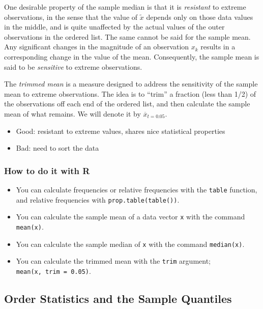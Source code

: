 \documentclass[]{book}
\providecommand{\tightlist}{%
  \setlength{\itemsep}{0pt}\setlength{\parskip}{0pt}}
\numberwithin{equation}{chapter}
\numberwithin{figure}{chapter}
\theoremstyle{plain}
\theoremstyle{definition}
\theoremstyle{remark}
\theoremstyle{definition}
\theoremstyle{definition}
\theoremstyle{remark}
\begin{document}
One desirable property of the sample median is that it is
\emph{resistant} to extreme observations, in the sense that the value of
\(\tilde{x}\) depends only on those data values in the middle, and is
quite unaffected by the actual values of the outer observations in the
ordered list. The same cannot be said for the sample mean. Any
significant changes in the magnitude of an observation \(x_{k}\) results
in a corresponding change in the value of the mean. Consequently, the
sample mean is said to be \emph{sensitive} to extreme observations.

The \emph{trimmed mean} is a measure designed to address the sensitivity
of the sample mean to extreme observations. The idea is to ``trim'' a
fraction (less than 1/2) of the observations off each end of the ordered
list, and then calculate the sample mean of what remains. We will denote
it by \(\overline{x}_{t=0.05}\).

\begin{itemize}
\tightlist
\item
  Good: resistant to extreme values, shares nice statistical properties
\item
  Bad: need to sort the data
\end{itemize}

\subsubsection{How to do it with R}\label{how-to-do-it-with-r}

\begin{itemize}
\tightlist
\item
  You can calculate frequencies or relative frequencies with the
  \texttt{table} function, and relative frequencies with
  \texttt{prop.table(table())}.
\item
  You can calculate the sample mean of a data vector \texttt{x} with the
  command \texttt{mean(x)}.
\item
  You can calculate the sample median of \texttt{x} with the command
  \texttt{median(x)}.
\item
  You can calculate the trimmed mean with the \texttt{trim} argument;
  \texttt{mean(x,\ trim\ =\ 0.05)}.
\end{itemize}

\subsection{Order Statistics and the Sample
Quantiles}\label{sub-order-statistics}
\end{document}
